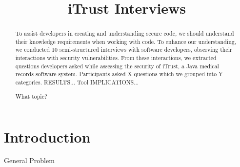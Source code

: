 \documentclass[conference]{IEEEtran}
\begin{document}
%
\title{iTrust Interviews}


\author{
}



\maketitle

\begin{abstract}
To assist developers in creating and understanding secure code, we should understand their knowledge requirements when working with code. 
To enhance our understanding, we conducted 10 semi-structured interviews with software developers, observing their interactions with security vulnerabilities. 
From these interactions, we extracted questions developers asked while assessing the security of iTrust, a Java medical records software system. 
Participants asked X questions which we grouped into Y categories. RESULTS...
Tool IMPLICATIONS...

What topic?

\end{abstract}


%
\IEEEpeerreviewmaketitle



\section{Introduction}
General Problem
\end{document}
